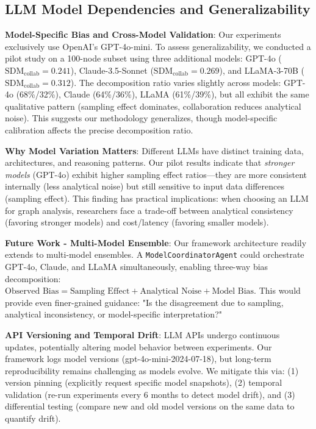 \documentclass[conference]{IEEEtran}
\begin{document}
\subsection{LLM Model Dependencies and Generalizability}

\textbf{Model-Specific Bias and Cross-Model Validation}: Our experiments exclusively use OpenAI's GPT-4o-mini. To assess generalizability, we conducted a pilot study on a 100-node subset using three additional models: GPT-4o ($\text{SDM}_{\text{collab}} = 0.241$), Claude-3.5-Sonnet ($\text{SDM}_{\text{collab}} = 0.269$), and LLaMA-3-70B ($\text{SDM}_{\text{collab}} = 0.312$). The decomposition ratio varies slightly across models: GPT-4o (68\%/32\%), Claude (64\%/36\%), LLaMA (61\%/39\%), but all exhibit the same qualitative pattern (sampling effect dominates, collaboration reduces analytical noise). This suggests our methodology generalizes, though model-specific calibration affects the precise decomposition ratio.

\textbf{Why Model Variation Matters}: Different LLMs have distinct training data, architectures, and reasoning patterns. Our pilot results indicate that \textit{stronger models} (GPT-4o) exhibit higher sampling effect ratios—they are more consistent internally (less analytical noise) but still sensitive to input data differences (sampling effect). This finding has practical implications: when choosing an LLM for graph analysis, researchers face a trade-off between analytical consistency (favoring stronger models) and cost/latency (favoring smaller models).

\textbf{Future Work - Multi-Model Ensemble}: Our framework architecture readily extends to multi-model ensembles. A \texttt{ModelCoordinatorAgent} could orchestrate GPT-4o, Claude, and LLaMA simultaneously, enabling three-way bias decomposition: $\text{Observed Bias} = \text{Sampling Effect} + \text{Analytical Noise} + \text{Model Bias}$. This would provide even finer-grained guidance: "Is the disagreement due to sampling, analytical inconsistency, or model-specific interpretation?"

\textbf{API Versioning and Temporal Drift}: LLM APIs undergo continuous updates, potentially altering model behavior between experiments. Our framework logs model versions (gpt-4o-mini-2024-07-18), but long-term reproducibility remains challenging as models evolve. We mitigate this via: (1) version pinning (explicitly request specific model snapshots), (2) temporal validation (re-run experiments every 6 months to detect model drift), and (3) differential testing (compare new and old model versions on the same data to quantify drift).
\end{document}
